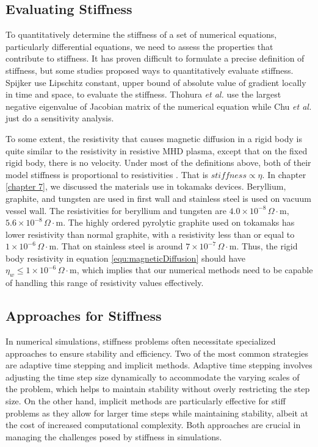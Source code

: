 \subsection{Evaluating Stiffness}
\label{section7.2.1}
To quantitatively determine the stiffness of a set of numerical equations, particularly differential equations, we need to assess the properties that contribute to stiffness. It has proven difficult to formulate a precise definition of stiffness, but some studies proposed ways to quantitatively evaluate stiffness. Spijker \cite{spijker1996stiffness} use Lipschitz constant, upper bound of absolute value of gradient locally in time and space, to evaluate the stiffness. Thohura \textit{et al.} \cite{thohura2013numerical} use the largest negative eigenvalue of Jacobian matrix of the numerical equation while Chu \textit{et al.} \cite{chu1996evolutionary} just do a sensitivity analysis. 

To some extent, the resistivity that causes magnetic diffusion in a rigid body is quite similar to the resistivity in resistive MHD plasma, except that on the fixed rigid body, there is no velocity. Under most of the definitions above, both of their model stiffness is proportional to resistivities \cite{wright2020resistive}. That is $\textit{stiffness}\propto \eta$. In chapter \ref{chapter 7}, we discussed the materials use in tokamaks devices. Beryllium, graphite, and tungsten are used in first wall and stainless steel is used on vacuum vessel wall. The resistivities for beryllium and tungsten are $4.0 \times 10^{-8} \, \Omega \cdot \text{m}$, $5.6 \times 10^{-8} \, \Omega \cdot \text{m}$. The highly ordered pyrolytic graphite used on tokamaks has lower resistivity than normal graphite, with a resistivity less than or equal to $1 \times 10^{-6} \, \Omega \cdot \text{m}$. That on stainless steel is around  $7 \times 10^{-7} \, \Omega \cdot \text{m}$. Thus, the rigid body resistivity in equation \ref{equ:magneticDiffusion} should have $\eta_w\leq1 \times 10^{-6} \, \Omega \cdot \text{m}$, which implies that our numerical methods need to be capable of handling this range of resistivity values effectively.

\subsection{Approaches for Stiffness}
In numerical simulations, stiffness problems often necessitate specialized approaches to ensure stability and efficiency. Two of the most common strategies are adaptive time stepping and implicit methods. Adaptive time stepping involves adjusting the time step size dynamically to accommodate the varying scales of the problem, which helps to maintain stability without overly restricting the step size. On the other hand, implicit methods are particularly effective for stiff problems as they allow for larger time steps while maintaining stability, albeit at the cost of increased computational complexity. Both approaches are crucial in managing the challenges posed by stiffness in simulations.
